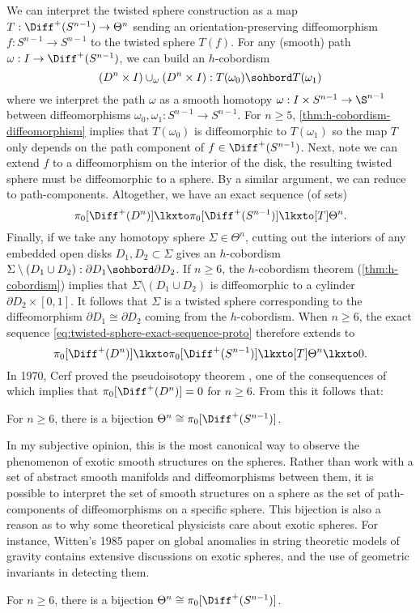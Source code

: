 	We can interpret the twisted sphere construction as a map $T: \Diff^+(S^{n-1})\to \Theta^n$ sending an orientation-preserving diffeomorphism $f : S^{n-1} \to S^{n-1}$ to the twisted sphere $T(f)$. For any (smooth) path $\omega : I \to \Diff^+(S^{n-1})$, we can build an $h$-cobordism 
	\[ (D^n\times I)\cup_\omega (D^n\times I) : T(\omega_0) \sohbord T(\omega_1)\]
	where we interpret the path $\omega$ as a smooth homotopy $\omega : I\times S^{n-1}\to\S^{n-1}$ between diffeomorphisms $\omega_0, \omega_1 : S^{n-1} \to S^{n-1}$. For $n\geq 5$, \cref{thm:h-cobordism-diffeomorphism} implies that $T(\omega_0)$ is diffeomorphic to $T(\omega_1)$ so the map $T$ only depends on the path component of $f\in \Diff^+(S^{n-1})$.
	Next, note we can extend $f$ to a diffeomorphism on the interior of the disk, the resulting twisted sphere must be diffeomorphic to a sphere. By a similar argument, we can reduce to path-components. Altogether, we have an exact sequence (of sets)
	\begin{equation}\label{eq:twisted-sphere-exact-sequence-proto}
		\pi_0 [\Diff^+(D^n)] \lkxto \pi_0 [\Diff^+(S^{n-1})] \lkxto[T] \Theta^n.
	\end{equation}
	Finally, if we take any homotopy sphere $\Sigma\in \Theta^n$, cutting out the interiors of any embedded open disks $D_1, D_2\subset \Sigma$ gives an $h$-cobordism $\Sigma\setminus(D_1\cup D_2) : \partial D_1 \sohbord \partial D_2$. If $n\geq 6$, the $h$-cobordism theorem (\ref{thm:h-cobordism}) implies that $\Sigma \setminus (D_1\cup D_2)$ is diffeomorphic to a cylinder $\partial D_2\times [0,1]$. It follows that $\Sigma$ is a twisted sphere corresponding to the diffeomorphism $\partial D_1 \cong \partial D_2$ coming from the $h$-cobordism.
	When $n\geq 6$, the exact sequence \cref{eq:twisted-sphere-exact-sequence-proto} therefore extends to 
	\[
		\pi_0 [\Diff^+(D^n)] \lkxto \pi_0 [\Diff^+(S^{n-1})] \lkxto[T] \Theta^n \lkxto 0.
	\]
	In 1970, Cerf proved the pseudoisotopy theorem \cite{cerf1970pseudoisotopy}, one of the consequences of which implies that $\pi_0[\Diff^+(D^n)]=0$ for $n\geq 6$. From this it follows that:

	\begin{proposition}
		For $n\geq 6$, there is a bijection $\Theta^n \cong \pi_0[\Diff^+(S^{n-1})]$.
	\end{proposition}

	In my subjective opinion, this is the most canonical way to observe the phenomenon of exotic smooth structures on the spheres. Rather than work with a set of abstract smooth manifolds and diffeomorphisms between them, it is possible to interpret the set of smooth structures on a sphere as the set of path-components of diffeomorphisms on a specific sphere. This bijection is also a reason as to why some theoretical physicists care about exotic spheres.  
	For instance, Witten's 1985 paper \cite{witten1985anomalies} on global anomalies in string theoretic models of gravity contains extensive discussions on exotic spheres, and the use of geometric invariants in detecting them.

\begin{theorem}
  For $n\geq 6$, there is a bijection $\Theta^n \cong \pi_0[\Diff^+(S^{n-1})]$.
\end{theorem}
